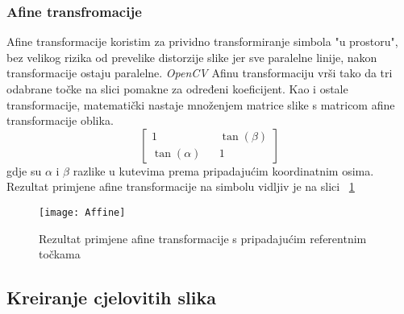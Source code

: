 \subsubsection{Afine transfromacije}
Afine transformacije koristim za prividno transformiranje simbola "u prostoru", bez velikog rizika od prevelike distorzije slike jer sve paralelne linije, nakon transformacije ostaju paralelne.
\emph{OpenCV} Afinu transformaciju vrši tako da tri odabrane točke na slici pomakne za određeni koeficijent.
Kao i ostale transformacije, matematički nastaje množenjem matrice slike s matricom afine transformacije oblika.
$$
\begin{bmatrix}
	1 && \tan(\beta) \\
	\tan(\alpha) && 1
\end{bmatrix}
$$
gdje su $\alpha$ i $\beta$ razlike u kutevima prema pripadajućim koordinatnim osima.
Rezultat primjene afine transformacije na simbolu vidljiv je na slici ~\ref{fig:Affine}
\lstset{numbers=left}

\begin{figure}[h!]
	\centering
	\texttt{[image: Affine]}
	 \caption{Rezultat primjene afine transformacije s pripadajućim referentnim točkama}
 	 \label{fig:Affine}
\end{figure}

\subsection{Kreiranje cjelovitih slika}
